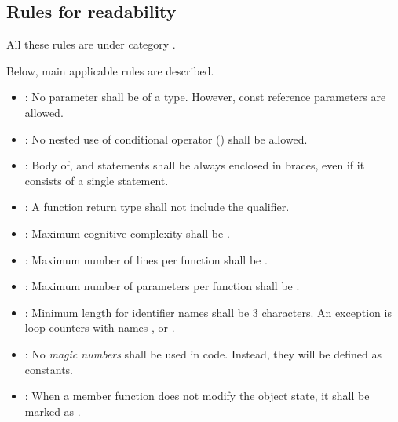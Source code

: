 \subsection{Rules for readability}

All these rules are under category
.

Below, main applicable rules are described.

\begin{itemize}

\item {}:
No parameter shall be of a  type.
However, const reference parameters are allowed.

\item {}:
No nested use of conditional operator () shall be allowed.

\item {}:
Body of,  and  statements
shall be always enclosed in braces, even if it consists of a single statement.

\item {}:
A function return type shall not include the  qualifier.

\item {}:
Maximum cognitive complexity shall be .

\item {}:
Maximum number of lines per function shall be .

\item {}:
Maximum number of parameters per function shall be .

\item {}:
Minimum length for identifier names shall be 3 characters.
An exception is loop counters with names ,  or .

\item {}:
No \emph{magic numbers} shall be used in code.
Instead, they will be defined as constants.

\item {}:
When a member function does not modify the object state, it shall be marked as .

\end{itemize}
